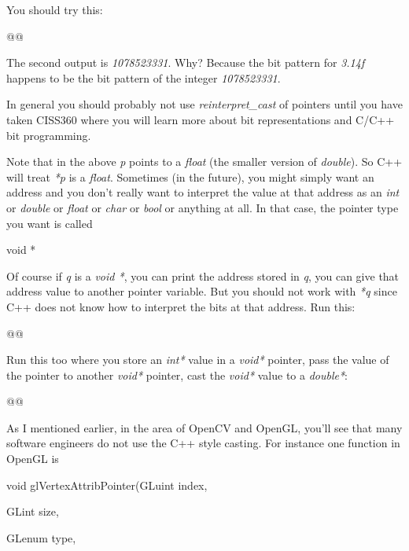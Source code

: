 \documentclass[
]{article}
\begin{document}
You should try this:

\begin{longtable}[]{@{}@{}}
\toprule\noalign{}
\endhead
\bottomrule\noalign{}
\endlastfoot
\end{longtable}

The second output is \emph{1078523331}. Why? Because the bit pattern for
\emph{3.14f} happens to be the bit pattern of the integer
\emph{1078523331}.

In general you should probably not use \emph{reinterpret\_cast} of
pointers until you have taken CISS360 where you will learn more about
bit representations and C/C++ bit programming.

Note that in the above \emph{p} points to a \emph{float} (the smaller
version of \emph{double}). So C++ will treat \emph{*p} is a
\emph{float}. Sometimes (in the future), you might simply want an
address and you don't really want to interpret the value at that address
as an \emph{int} or \emph{double} or \emph{float} or \emph{char} or
\emph{bool} or anything at all. In that case, the pointer type you want
is called

void *

Of course if \emph{q} is a \emph{void *}, you can print the address
stored in \emph{q}, you can give that address value to another pointer
variable. But you should not work with \emph{*q} since C++ does not know
how to interpret the bits at that address. Run this:

\begin{longtable}[]{@{}@{}}
\toprule\noalign{}
\endhead
\bottomrule\noalign{}
\endlastfoot
\end{longtable}

Run this too where you store an \emph{int*} value in a \emph{void*}
pointer, pass the value of the pointer to another \emph{void*} pointer,
cast the \emph{void*} value to a \emph{double*}:

\begin{longtable}[]{@{}@{}}
\toprule\noalign{}
\endhead
\bottomrule\noalign{}
\endlastfoot
\end{longtable}

As I mentioned earlier, in the area of OpenCV and OpenGL, you'll see
that many software engineers do not use the C++ style casting. For
instance one function in OpenGL is

void glVertexAttribPointer(GLuint index,

GLint size,

GLenum type,
\end{document}
